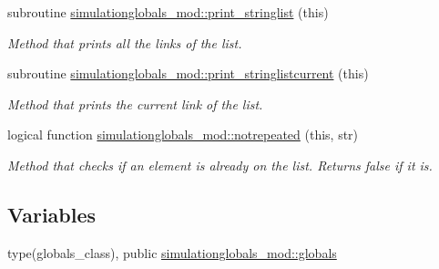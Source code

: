 \begin{DoxyCompactItemize}
subroutine \mbox{\hyperlink{namespacesimulationglobals__mod_a7adb33aaa9ea0a94c38789c07ff3e787}{simulationglobals\+\_\+mod\+::print\+\_\+stringlist}} (this)
\begin{DoxyCompactList}\small\item\em Method that prints all the links of the list. \end{DoxyCompactList}\item 
subroutine \mbox{\hyperlink{namespacesimulationglobals__mod_a405f70548e38f0af65d4cbdb7c7025a4}{simulationglobals\+\_\+mod\+::print\+\_\+stringlistcurrent}} (this)
\begin{DoxyCompactList}\small\item\em Method that prints the current link of the list. \end{DoxyCompactList}\item 
logical function \mbox{\hyperlink{namespacesimulationglobals__mod_a12410ee549ead4c6d892dca6ead74d15}{simulationglobals\+\_\+mod\+::notrepeated}} (this, str)
\begin{DoxyCompactList}\small\item\em Method that checks if an element is already on the list. Returns false if it is. \end{DoxyCompactList}\end{DoxyCompactItemize}
\subsection*{Variables}
\begin{DoxyCompactItemize}
\item 
type(globals\+\_\+class), public \mbox{\hyperlink{namespacesimulationglobals__mod_acf1e2786d81bd0fe337a8458efce8733}{simulationglobals\+\_\+mod\+::globals}}
\end{DoxyCompactItemize}
